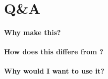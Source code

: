 \section{Q\&A}


\paragraph{Why make this?}


\paragraph{How does this differe from ?}


\paragraph{Why would I want to use it?}